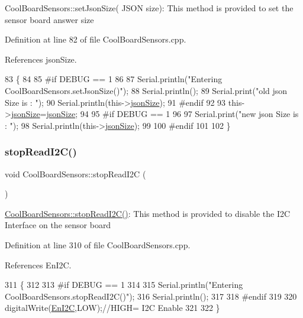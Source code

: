 Cool\+Board\+Sensors\+::set\+Json\+Size( J\+S\+O\+N size)\+: This method is provided to set the sensor board answer size 

Definition at line 82 of file Cool\+Board\+Sensors.\+cpp.



References json\+Size.


\begin{DoxyCode}
83 \{
84 
85 \textcolor{preprocessor}{#if DEBUG == 1}
86 
87     Serial.println(\textcolor{stringliteral}{"Entering CoolBoardSensors.setJsonSize()"});
88     Serial.println();   
89     Serial.print(\textcolor{stringliteral}{"old json Size is : "});
90     Serial.println(this->\hyperlink{classCoolBoardSensors_a05a40dc80bfff14ffb830f549b876f8d}{jsonSize});
91 \textcolor{preprocessor}{#endif}
92         
93     this->\hyperlink{classCoolBoardSensors_a05a40dc80bfff14ffb830f549b876f8d}{jsonSize}=\hyperlink{classCoolBoardSensors_a05a40dc80bfff14ffb830f549b876f8d}{jsonSize};
94 
95 \textcolor{preprocessor}{#if DEBUG == 1 }
96     
97     Serial.print(\textcolor{stringliteral}{"new json Size is : "});
98     Serial.println(this->\hyperlink{classCoolBoardSensors_a05a40dc80bfff14ffb830f549b876f8d}{jsonSize});
99 
100 \textcolor{preprocessor}{#endif}
101     
102 \}
\end{DoxyCode}
\mbox{\label{classCoolBoardSensors_ab67b900b9e5e7c18d52d2d9107ba171b}} 
\subsubsection{\texorpdfstring{stop\+Read\+I2\+C()}{stopReadI2C()}}
{\footnotesize\ttfamily void Cool\+Board\+Sensors\+::stop\+Read\+I2C (\begin{DoxyParamCaption}{ }\end{DoxyParamCaption})}

\hyperlink{classCoolBoardSensors_ab67b900b9e5e7c18d52d2d9107ba171b}{Cool\+Board\+Sensors\+::stop\+Read\+I2\+C()}\+: This method is provided to disable the I2C Interface on the sensor board 

Definition at line 310 of file Cool\+Board\+Sensors.\+cpp.



References En\+I2C.


\begin{DoxyCode}
311 \{
312 
313 \textcolor{preprocessor}{#if DEBUG == 1}
314 
315     Serial.println(\textcolor{stringliteral}{"Entering CoolBoardSensors.stopReadI2C()"});
316     Serial.println();
317 
318 \textcolor{preprocessor}{#endif}
319 
320     digitalWrite(\hyperlink{classCoolBoardSensors_aaa6b5dbf3a6633bffd9d204d961096dc}{EnI2C},LOW);\textcolor{comment}{//HIGH= I2C Enable}
321 
322 \}
\end{DoxyCode}


